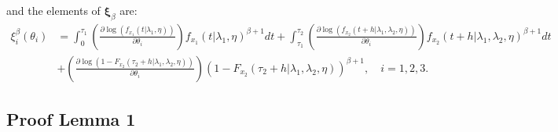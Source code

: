 \documentclass{article}
\begin{document}
and the elements of $\mathbf{\xi}_{\beta}$ are:
\begin{align*}
\xi_{i}^{\beta}(\theta_i)&=\int_0^{\tau_1}\left(\frac{\partial\log(f_{x_1}(t|\lambda_1,\eta))}{\partial \theta_i}\right) f_{x_1}(t|\lambda_1,\eta)^{\beta+1}dt+\int_{\tau_1}^{\tau_2}\left(\frac{\partial\log(f_{x_2}(t+h|\lambda_1,\lambda_2,\eta))}{\partial \theta_i}\right) f_{x_2}(t+h|\lambda_1,\lambda_2,\eta)^{\beta+1}dt
\\
&+\left(\frac{\partial\log(1-F_{x_2}(\tau_2+h|\lambda_1,\lambda_2,\eta))}{\partial \theta_i}\right) (1-F_{x_2}(\tau_2+h|\lambda_1,\lambda_2,\eta))^{\beta+1}, \quad i=1,2,3.
\end{align*}
\subsection{Proof Lemma 1}
\end{document}
